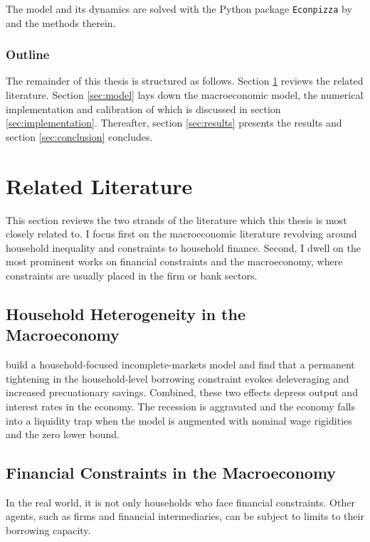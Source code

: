 \documentclass[12pt]{article}
\numberwithin{equation}{section} %
\begin{document}
The model and its dynamics are solved with the Python package \texttt{Econpizza} by \textcite{boehl2023econpizza} and the methods therein.

\subsubsection*{Outline}
\label{sec:outline}
The remainder of this thesis is structured as follows. Section \ref{sec:literature} reviews the related literature. Section \ref{sec:model} lays down the macroeconomic model, the numerical implementation and calibration of which is discussed in section \ref{sec:implementation}. Thereafter, section \ref{sec:results} presents the results and section \ref{sec:conclusion} concludes.

\section{Related Literature}
\label{sec:literature}

This section reviews the two strands of the literature which this thesis is most closely related to. I focus first on the macroeconomic literature revolving around household inequality and constraints to household finance. Second, I dwell on the most prominent works on financial constraints and the macroeconomy, where constraints are usually placed in the firm or bank sectors.

\subsection{Household Heterogeneity in the Macroeconomy}
\label{sec:literature-hetero}

\textcite{gl2017} build a household-focused incomplete-markets model and find that a permanent tightening in the household-level borrowing constraint evokes deleveraging and increased precuationary savings. Combined, these two effects depress output and interest rates in the economy. The recession is aggravated and the economy falls into a liquidity trap when the model is augmented with nominal wage rigidities and the zero lower bound. 

\subsection{Financial Constraints in the Macroeconomy}
\label{sec:literature-finance}

In the real world, it is not only households who face financial constraints. Other agents, such as firms and financial intermediaries, can be subject to limits to their borrowing capacity.
\end{document}
